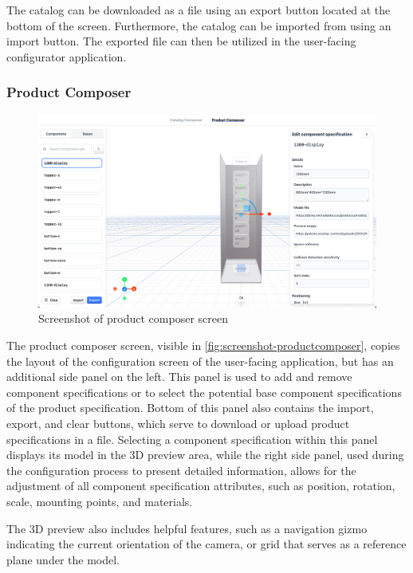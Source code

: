 The catalog can be downloaded as a  file using an export button located at the bottom of the screen. Furthermore, the catalog can be imported from  using an import button. The exported file can then be utilized in the user-facing configurator application.


\subsubsection{Product Composer}

\begin{figure}[h!]
\centering
\includegraphics[width=\textwidth]{images/screenshot_productcomposer.png}
\caption{Screenshot of product composer screen}
\label{fig:screenshot-productcomposer}
\end{figure}

The product composer screen, visible in \autoref{fig:screenshot-productcomposer}, copies the layout of the configuration screen of the user-facing application, but has an additional side panel on the left. This panel is used to add and remove component specifications or to select the potential base component specifications of the product specification. Bottom of this panel also contains the import, export, and clear buttons, which serve to download or upload product specifications in a  file. Selecting a component specification within this panel displays its model in the 3D preview area, while the right side panel, used during the configuration process to present detailed information, allows for the adjustment of all component specification attributes, such as position, rotation, scale, mounting points, and materials.

The 3D preview also includes helpful features, such as a navigation gizmo indicating the current orientation of the camera, or grid that serves as a reference plane under the model.


